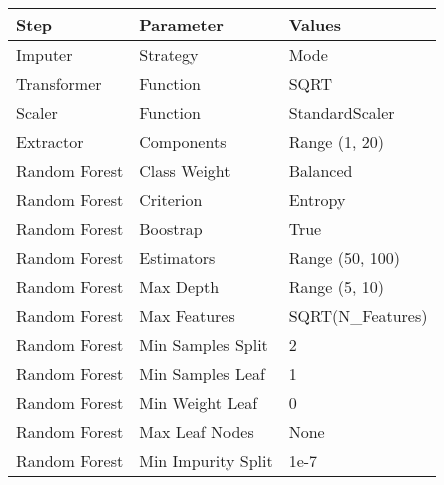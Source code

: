 \begin{tabular}{lll} \toprule
Step            & Parameter             & Values                        \\ \midrule
Imputer         & Strategy              & Mode                          \\
Transformer     & Function              & SQRT                          \\
Scaler          & Function              & StandardScaler                \\
Extractor       & Components            & Range (1, 20)                 \\
Random Forest   & Class Weight          & Balanced                      \\
Random Forest   & Criterion             & Entropy                       \\
Random Forest   & Boostrap              & True                          \\
Random Forest   & Estimators            & Range (50, 100)               \\
Random Forest   & Max Depth             & Range (5, 10)                 \\
Random Forest   & Max Features          & SQRT(N_Features)              \\
Random Forest   & Min Samples Split     & 2                             \\
Random Forest   & Min Samples Leaf      & 1                             \\
Random Forest   & Min Weight Leaf       & 0                             \\
Random Forest   & Max Leaf Nodes        & None                          \\
Random Forest   & Min Impurity Split    & 1e-7                          \\
\bottomrule \end{tabular}
